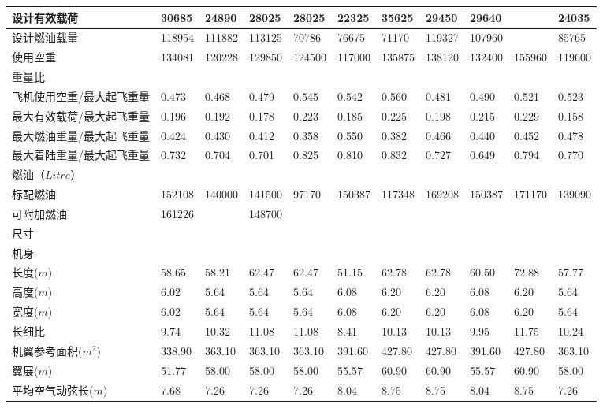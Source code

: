 \documentclass[12pt,a4paper]{report}
\begin{document}
\begin{landscape}
\begin{center}
\begin{longtable}{|p{1.5cm}|p{1.3cm}|p{1.1cm}|p{1.1cm}|p{1.1cm}|p{1.1cm}|p{1.1cm}|p{1.1cm}|p{1.1cm}|p{1.1cm}|p{1.1cm}|}
设计有效载荷	&	30685	&	24890	&	28025	&	28025	&	22325	&	35625	&	29450	&	29640	&		&	24035\\ \hline
设计燃油载量	&	118954	&	111882	&	113125	&	70786	&	76675	&	71170	&	119327	&	107960	&		&	85765\\ \hline
使用空重	&	134081	&	120228	&	129850	&	124500	&	117000	&	135875	&	138120	&	132400	&	155960	&	119600\\ \hline
重量比	&		&		&		&		&		&		&		&		&		&	\\ \hline
飞机使用空重/最大起飞重量	&	0.473	&	0.468	&	0.479	&	0.545	&	0.542	&	0.560	&	0.481	&	0.490	&	0.521	&	0.523\\ \hline
最大有效载荷/最大起飞重量	&	0.196	&	0.192	&	0.178	&	0.223	&	0.185	&	0.225	&	0.198	&	0.215	&	0.229	&	0.158\\ \hline
最大燃油重量/最大起飞重量	&	0.424	&	0.430	&	0.412	&	0.358	&	0.550	&	0.382	&	0.466	&	0.440	&	0.452	&	0.478\\ \hline
最大着陆重量/最大起飞重量	&	0.732	&	0.704	&	0.701	&	0.825	&	0.810	&	0.832	&	0.727	&	0.649	&	0.794	&	0.770\\ \hline
燃油（$Litre$）	&		&		&		&		&		&		&		&		&		&	\\ \hline
标配燃油	&	152108	&	140000	&	141500	&	97170	&	150387	&	117348	&	169208	&	150387	&	171170	&	139090\\ \hline
可附加燃油	&	161226	&		&	148700	&		&		&		&		&		&		&	\\ \hline
尺寸	&		&		&		&		&		&		&		&		&		&	\\ \hline
机身	&		&		&		&		&		&		&		&		&		&	\\ \hline
长度($m$)	&	58.65	&	58.21	&	62.47	&	62.47	&	51.15	&	62.78	&	62.78	&	60.50	&	72.88	&	57.77\\ \hline
高度($m$)	&	6.02	&	5.64	&	5.64	&	5.64	&	6.08	&	6.20	&	6.20	&	6.08	&	6.20	&	5.64\\ \hline
宽度($m$)	&	6.02	&	5.64	&	5.64	&	5.64	&	6.08	&	6.20	&	6.20	&	6.08	&	6.20	&	5.64\\ \hline
长细比	&	9.74	&	10.32	&	11.08	&	11.08	&	8.41	&	10.13	&	10.13	&	9.95	&	11.75	&	10.24\\ \hline
机翼参考面积($m^2$)	&	338.90	&	363.10	&	363.10	&	363.10	&	391.60	&	427.80	&	427.80	&	391.60	&	427.80	&	363.10\\ \hline
翼展($m$)	&	51.77	&	58.00	&	58.00	&	58.00	&	55.57	&	60.90	&	60.90	&	55.57	&	60.90	&	58.00\\ \hline
平均空气动弦长($m$)	&	7.68	&	7.26	&	7.26	&	7.26	&	8.04	&	8.75	&	8.75	&	8.04	&	8.75	&	7.26\\ \hline

\end{longtable}
\end{center}
\end{landscape}
\end{document}
